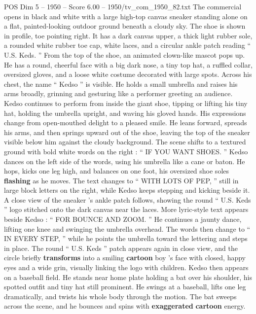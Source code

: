 \begin{textsample}{POS Dim 5 – 1950 – Score 6.00 – 1950/tv\_com\_1950\_82.txt}  \label{ex:f5_pos_078}
The commercial opens in black and white with a large high-top canvas sneaker standing alone on a flat, painted-looking outdoor ground beneath a cloudy sky.
The shoe is shown in profile, toe pointing right.
It has a dark canvas upper, a thick light rubber sole, a rounded white rubber toe cap, white laces, and a circular ankle patch reading “ U.S.
Keds. ” From the top of the shoe, an animated clown-like mascot pops up.
He has a round, cheerful face with a big dark nose, a tiny top hat, a ruffled collar, oversized gloves, and a loose white costume decorated with large spots.
Across his chest, the name “ Kedso ” is visible.
He holds a small umbrella and raises his arms broadly, grinning and gesturing like a performer greeting an audience.
Kedso continues to perform from inside the giant shoe, tipping or lifting his tiny hat, holding the umbrella upright, and waving his gloved hands.
His expressions change from open-mouthed delight to a pleased smile.
He leans forward, spreads his arms, and then springs upward out of the shoe, leaving the top of the sneaker visible below him against the cloudy background.
The scene shifts to a textured ground with bold white words on the right : “ IF YOU WANT SHOES. ” Kedso dances on the left side of the words, using his umbrella like a cane or baton.
He hops, kicks one leg high, and balances on one foot, his oversized shoe soles \textbf{flashing} as he moves.
The text changes to “ WITH LOTS OF PEP, ” still in large block letters on the right, while Kedso keeps stepping and kicking beside it.
A close view of the sneaker ’s ankle patch follows, showing the round “ U.S.
Keds ” logo stitched onto the dark canvas near the laces.
More lyric-style text appears beside Kedso : “ FOR BOUNCE AND ZOOM. ” He continues a jaunty dance, lifting one knee and swinging the umbrella overhead.
The words then change to “ IN EVERY STEP, ” while he points the umbrella toward the lettering and steps in place.
The round “ U.S.
Keds ” patch appears again in close view, and the circle briefly \textbf{transforms} into a smiling \textbf{cartoon} boy ’s face with closed, happy eyes and a wide grin, visually linking the logo with children.
Kedso then appears on a baseball field.
He stands near home plate holding a bat over his shoulder, his spotted outfit and tiny hat still prominent.
He swings at a baseball, lifts one leg dramatically, and twists his whole body through the motion.
The bat sweeps across the scene, and he bounces and spins with \textbf{exaggerated} \textbf{cartoon} energy.

\end{textsample}
